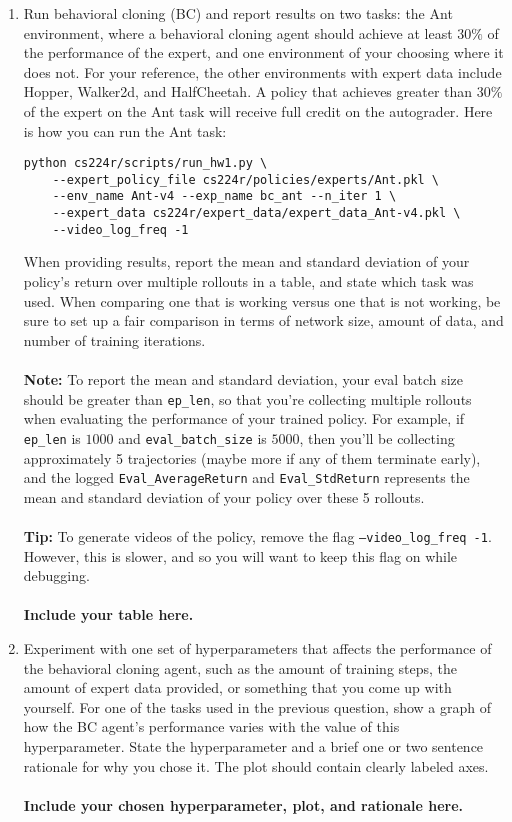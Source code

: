 \documentclass[12pt]{article}
\begin{document}
\begin{enumerate}
\item Run behavioral cloning (BC) and report results on two tasks: the Ant environment, where a behavioral cloning agent should achieve at least $30\%$ of the performance of the expert, and one environment of your choosing where it does not. For your reference, the other environments with expert data include Hopper, Walker2d, and HalfCheetah. A policy that achieves greater than $30\%$ of the expert on the Ant task will receive full credit on the autograder. Here is how you can run the Ant task:
\begin{tcolorbox}[width=\linewidth, sharp corners=all, colback=white!95!black]
\begin{verbatim}
python cs224r/scripts/run_hw1.py \
    --expert_policy_file cs224r/policies/experts/Ant.pkl \
    --env_name Ant-v4 --exp_name bc_ant --n_iter 1 \
    --expert_data cs224r/expert_data/expert_data_Ant-v4.pkl \
    --video_log_freq -1
\end{verbatim}
\end{tcolorbox}

\noindent When providing results, report the mean and standard deviation of your policy’s return over multiple rollouts in a table, and state which task was used. When comparing one that is working versus one that is not working, be sure to set up a fair comparison in terms of network size, amount of data, and number of training iterations. \\
\\
\noindent \textbf{Note:} To report the mean and standard deviation, your eval batch size should be greater than \texttt{ep\_len}, so that you’re collecting multiple rollouts when evaluating the performance of your trained policy. For example, if \texttt{ep\_len} is $1000$ and \texttt{eval\_batch\_size} is $5000$, then you’ll be collecting approximately 5 trajectories (maybe more if any of them terminate early), and the logged \texttt{Eval\_AverageReturn} and \texttt{Eval\_StdReturn} represents the mean and standard deviation of your policy over these 5 rollouts. \\
\\
\textbf{Tip:} To generate videos of the policy, remove the flag \texttt{--video\_log\_freq -1}. However, this is slower, and so you will want to keep this flag on while debugging. \\
\\
\textbf{\color{red}Include your table here.}

\item Experiment with one set of hyperparameters that affects the performance of the behavioral cloning agent, such as the amount of training steps, the amount of expert data provided, or something that you come up with yourself. For one of the tasks used in the previous question, show a graph of how the BC agent’s performance varies with the value of this hyperparameter. State the hyperparameter and a brief one or two sentence rationale for why you chose it. The plot should contain clearly labeled axes.\\
\\
\textbf{\color{red}Include your chosen hyperparameter, plot, and rationale here.}


\end{enumerate}
\end{document}
